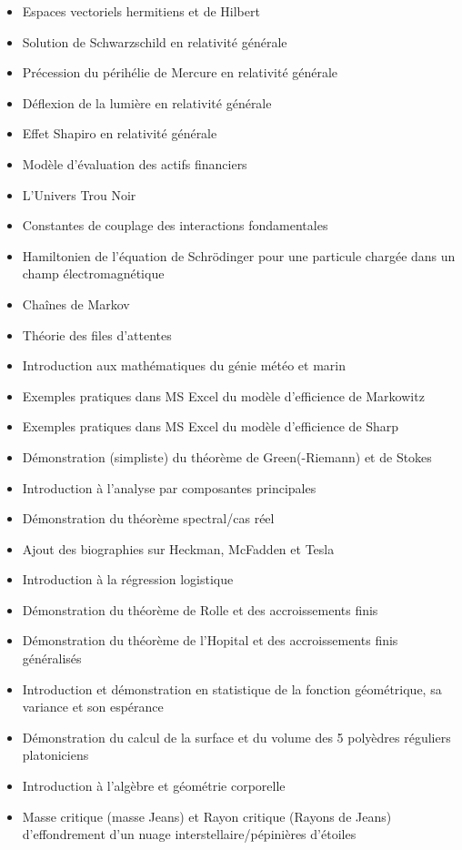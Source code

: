 \begin{itemize}
\begin{itemize}[noitemsep]
				\item Espaces vectoriels hermitiens et de Hilbert
				\item Solution de Schwarzschild en relativité générale
				\item Précession du périhélie de Mercure en relativité générale
				\item Déflexion de la lumière en relativité générale
				\item Effet Shapiro en relativité générale
				\item Modèle d'évaluation des actifs financiers
				\item L'Univers Trou Noir
				\item Constantes de couplage des interactions fondamentales
				\item Hamiltonien de l'équation de Schrödinger pour une particule chargée dans un champ électromagnétique
				\item Chaînes de Markov
				\item Théorie des files d'attentes
				\item Introduction aux mathématiques du génie météo et marin
				\item Exemples pratiques dans MS Excel du modèle d'efficience de Markowitz
				\item Exemples pratiques dans MS Excel du modèle d'efficience de Sharp
				\item Démonstration (simpliste) du théorème de Green(-Riemann) et de Stokes
				\item Introduction à l'analyse par composantes principales
				\item Démonstration du théorème spectral/cas réel
				\item Ajout des biographies sur Heckman, McFadden et Tesla
				\item Introduction à la régression logistique
				\item Démonstration du théorème de Rolle et des accroissements finis
				\item Démonstration du théorème de l'Hopital et des accroissements finis généralisés
				\item Introduction et démonstration en statistique de la fonction géométrique, sa variance et son espérance
				\item Démonstration du calcul de la surface et du volume des 5 polyèdres réguliers platoniciens
				\item Introduction à l'algèbre et géométrie corporelle
				\item Masse critique (masse Jeans) et Rayon critique (Rayons de Jeans) d'effondrement d'un nuage interstellaire/pépinières d'étoiles

\end{itemize}
\end{itemize}
